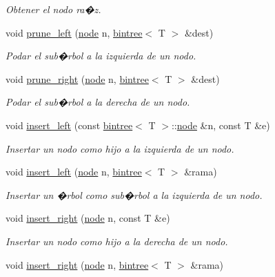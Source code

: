 \begin{DoxyCompactItemize}
\begin{DoxyCompactList}\small\item\em Obtener el nodo ra�z. \end{DoxyCompactList}\item 
void \hyperlink{classbintree_a74b4b7570b9b574391742f892520562b}{prune\+\_\+left} (\hyperlink{classbintree_1_1node}{node} n, \hyperlink{classbintree}{bintree}$<$ T $>$ \&dest)
\begin{DoxyCompactList}\small\item\em Podar el sub�rbol a la izquierda de un nodo. \end{DoxyCompactList}\item 
void \hyperlink{classbintree_ae468b92dd3eb70818ffbd969ff34d811}{prune\+\_\+right} (\hyperlink{classbintree_1_1node}{node} n, \hyperlink{classbintree}{bintree}$<$ T $>$ \&dest)
\begin{DoxyCompactList}\small\item\em Podar el sub�rbol a la derecha de un nodo. \end{DoxyCompactList}\item 
void \hyperlink{classbintree_a49d681962f17c3ef0b63ddd529d15e6a}{insert\+\_\+left} (const \hyperlink{classbintree}{bintree}$<$ T $>$\+::\hyperlink{classbintree_1_1node}{node} \&n, const T \&e)
\begin{DoxyCompactList}\small\item\em Insertar un nodo como hijo a la izquierda de un nodo. \end{DoxyCompactList}\item 
void \hyperlink{classbintree_a17611b995af1d5421197d155e75e683f}{insert\+\_\+left} (\hyperlink{classbintree_1_1node}{node} n, \hyperlink{classbintree}{bintree}$<$ T $>$ \&rama)
\begin{DoxyCompactList}\small\item\em Insertar un �rbol como sub�rbol a la izquierda de un nodo. \end{DoxyCompactList}\item 
void \hyperlink{classbintree_a8f25464ce656370a6ab5d56ac56a3b5e}{insert\+\_\+right} (\hyperlink{classbintree_1_1node}{node} n, const T \&e)
\begin{DoxyCompactList}\small\item\em Insertar un nodo como hijo a la derecha de un nodo. \end{DoxyCompactList}\item 
void \hyperlink{classbintree_a01c798112c64624e3e90ed027bfd76e1}{insert\+\_\+right} (\hyperlink{classbintree_1_1node}{node} n, \hyperlink{classbintree}{bintree}$<$ T $>$ \&rama)

\end{DoxyCompactItemize}
